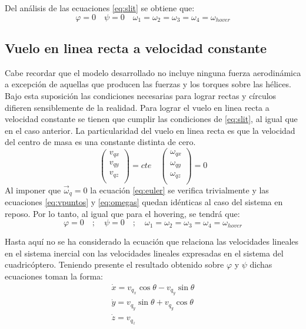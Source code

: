 \documentclass[main]{subfiles}
\begin{document}
Del an\'alisis de las ecuaciones \ref{eq:slit} se obtiene que:
\begin{equation}
\varphi=0 \quad \psi=0 \quad \omega_1=\omega_2=\omega_3=\omega_4=\omega_{hover}
\end{equation}


\subsection{Vuelo en linea recta a velocidad constante}

Cabe recordar que el modelo desarrollado no incluye ninguna fuerza aerodin\'amica a excepci\'on de aquellas que producen las fuerzas y los torques sobre las h\'elices. Bajo esta suposici\'on las condiciones necesarias para lograr rectas y c\'irculos difieren sensiblemente de la realidad. Para lograr el vuelo en linea recta a velocidad constante se tienen que cumplir las condiciones de \ref{eq:slit}, al igual que en el caso anterior. La particularidad del vuelo en linea recta es que la velocidad del centro de masa es una constante distinta de cero. 
\begin{equation}
\label{eq:recta}
\left(\begin{array}{c}
v_{qx}\\
v_{qy}\\
v_{qz}\\
\end{array}\right)=cte \quad
\left(\begin{array}{c}
\omega_{qx}\\
\omega_{qy}\\
\omega_{qz}\\
\end{array}\right)=0
\end{equation}
Al imponer que $\vec{\omega}_q=0$ la ecuaci\'on \ref{eq:euler} se verifica trivialmente y las ecuaciones \ref{eq:vpuntos} y \ref{eq:omegas} quedan id\'enticas al caso del sistema en reposo. Por lo tanto, al igual que para el hovering, se tendr\'a que:
\begin{equation}
\varphi=0 \quad ; \quad \psi=0 \quad ; \quad \omega_1=\omega_2=\omega_3=\omega_4 = \omega_{hover}
\end{equation}

Hasta aqu\'i no se ha considerado la ecuaci\'on que relaciona las velocidades lineales en el sistema inercial con las velocidades lineales expresadas en el sistema del cuadric\'optero. Teniendo presente el resultado obtenido sobre $\varphi$ y $\psi$ dichas ecuaciones toman la forma:
\begin{equation}\begin{array}{c}
\dot{x}=v_{q_x}\cos\theta-v_{q_y}\sin\theta\\
\dot{y}=v_{q_y}\sin\theta+v_{q_y}\cos\theta\\
\dot{z}=v_{q_z}
\end{array}
\end{equation} 
\end{document}

